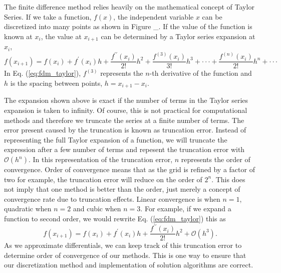 The finite difference method relies heavily on the mathematical concept of 
Taylor Series.  If we take a function, $f(x)$, the 
independent variable $x$ can be discretized into many points as shown in Figure \_.
If the value of the function is known at $x_{i}$, the value at $x_{i+1}$ can be
determined by a Taylor series expansion at $x_{i}$,
\begin{equation}
     f\left(x_{i+1}\right) = f\left(x_{i}\right) + f^{\prime}\left(x_{i}\right)h + 
     \frac{f^{\prime\prime}\left(x_{i}\right)}{2!}h^{2} + 
     \frac{f^{\left(3\right)}\left(x_{i}\right)}{3!}h^{3}+\cdot\cdot\cdot + 
     \frac{f^{\left(n\right)}\left(x_{i}\right)}{2!}h^{n} + \cdot\cdot\cdot
  \label{eq:fdm_taylor}
\end{equation}
In Eq. (\ref{eq:fdm_taylor}), $f^{\left(3\right)}$ represents the $n$-th derivative of 
the function and $h$ is the spacing between points, $h = x_{i+1} - x_{i}$.
\par
The expansion shown above is exact if the number of terms in the Taylor series
expansion is taken to infinity. Of course, this is not practical for computational
methods and therefore we truncate the series at a finite number of terms. The error
present caused by the truncation is known as truncation error.
Instead of representing the full Taylor expansion of a function, we will truncate
the expression after a few number of terms and repesent the truncation error with
$\mathcal{O}\left(h^{n}\right)$. In this representation of the truncation error,
$n$ represents the order of convergence. Order of
convergence means that as the grid is refined by a factor of two for example, the
truncation error will reduce on the order of $2^{n}$. This does not imply that
one method is better than the order, just merely a concept of convergence rate
due to truncation effects. Linear convergence is when $n=1$, quadratic when $n=2$
and cubic when $n=3$. For example, if we expand a function to second order, we
would rewrite Eq. (\ref{eq:fdm_taylor}) this as
\begin{equation}
     f\left(x_{i+1}\right) = f\left(x_{i}\right) + f^{\prime}\left(x_{i}\right)h + 
     \frac{f^{\prime\prime}\left(x_{i}\right)}{2!}h^{2} + \mathcal{O}\left(h^{3}\right).
\end{equation}
As we approximate differentials, we can keep track of this truncation error to determine
order of convergence of our methods. This is one way to ensure that our discretization
method and implementation of solution algorithms are correct.

